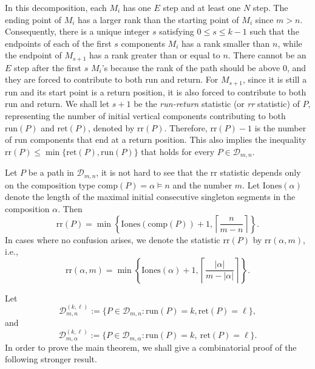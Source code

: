 \documentclass[11pt,a4paper,reqno]{article}
\newcommand{\DD}{\mathcal{D}}
\newcommand{\run}{\mathrm{run}}
\newcommand{\rr}{\mathrm{rr}}
\newcommand{\initones}{\mathrm{Iones}}
\newcommand{\ret}{\mathrm{ret}}
\newcommand{\al}{\alpha}
\newcommand{\comp}{\mathrm{comp}}
\newcommand{\LiLan}{}
\begin{document}
{	In this decomposition, each $M_i$ has one $E$ step and at least one $N$ step. The ending point of $M_i$ has a larger rank than the starting point of $M_i$ since $m>n$. Consequently, there is a unique integer $s$ satisfying $0\leq s\leq k-1$ such that the endpoints
    {\LiLan of each of the first $s$ components $M_i$ has a rank smaller than $n$, while the endpoint of $M_{s+1}$ has a rank greater than or equal to $n$}. There cannot be an $E$ step after the first $s$ $M_i$'s because the rank of the path should be above 0, and they are forced to contribute to both run and return. For $M_{s+1}$, since it is still a run and its start point is a return position, it is also forced to contribute to both run and return.
    We shall let $s+1$ { be} the {\textit{run-return} statistic (or \textit{rr} statistic)} of $P$, representing the number of initial vertical components contributing to both $\run(P)$ and $\ret(P)$, denoted by $\rr(P)$. {\LiLan Therefore, $\rr(P)-1$ is the number of run components that end at a return position.} This also implies the inequality $\rr(P)\le \min\{\ret(P),\run(P)\}$ that holds for every $P\in\DD_{m,n}$.
	
	
	
	
	
	
	
	
	
	
	
	
	Let $P$ be a path in $\DD_{m,n}$, it is not hard to see that the rr statistic depends only on the composition type $\comp(P)=\al\vDash n$ and the number $m$.
	Let $\initones(\al)$ denote the length of the maximal initial consecutive singleton segments in the composition $\al$. Then 
	\begin{equation}\label{rr0}
		\rr(P) = \min\left\{\initones(\comp(P))+1,\left\lceil\frac{n}{m-n}\right\rceil\right\}.
	\end{equation}
	In cases where no confusion arises, we denote the statistic $\rr(P)$ by $\rr(\al,m)$, i.e.,\
	\begin{equation}\label{rr}
		\rr(\al,m) = \min\left\{\initones(\al)+1,\left\lceil\frac{|\al|}{m-|\al|}\right\rceil\right\}.
	\end{equation}
	


    Let 
	$$\DD_{m,n}^{(k,\ell)}:=\{P\in \DD_{m,n}:\run(P)=k, \ret(P)=\ell\},$$
	and
	$$\DD_{m,\al}^{(k,\ell)}:=\{P\in \DD_{m,\al}:\run(P)=k,\ \ret(P)=\ell\}.$$
	In order to prove the main theorem, we shall give a combinatorial proof of the following stronger result. 

}
\end{document}
